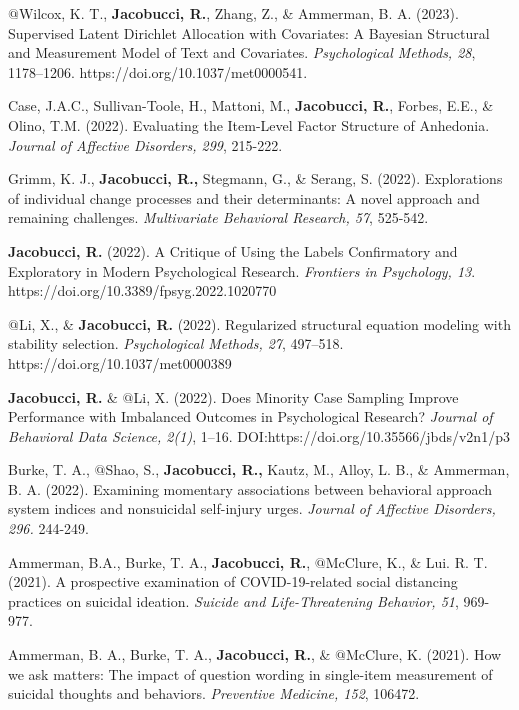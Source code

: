 \documentclass[letterpaper,10pt]{article}
\begin{document}
\begin{etaremune}
\item $@$Wilcox, K. T., \textbf{Jacobucci, R.}, Zhang, Z., \& Ammerman, B. A. (2023). Supervised Latent Dirichlet Allocation with Covariates: A Bayesian Structural and Measurement Model of Text and Covariates. \emph{Psychological Methods, 28}, 1178–1206. https://doi.org/10.1037/met0000541.
	
	
	\item Case, J.A.C., Sullivan-Toole, H., Mattoni, M., \textbf{Jacobucci, R.}, Forbes, E.E., \& Olino, T.M. (2022). Evaluating the Item-Level Factor Structure of Anhedonia. \emph{Journal of Affective Disorders, 299}, 215-222.
	
	\item Grimm, K. J., \textbf{Jacobucci, R.,} Stegmann, G., \& Serang, S. (2022). Explorations of individual change processes and their determinants: A novel approach and remaining challenges. \emph{Multivariate Behavioral Research, 57}, 525-542.
		\item \textbf{Jacobucci, R.} (2022). A Critique of Using the Labels Confirmatory and Exploratory in Modern Psychological Research. \textit{Frontiers in Psychology, 13}. https://doi.org/10.3389/fpsyg.2022.1020770
	\item $@$Li, X., \& \textbf{Jacobucci, R.} (2022). Regularized structural equation modeling with stability selection. \emph{Psychological Methods, 27}, 497–518. https://doi.org/10.1037/met0000389
		\item \textbf{Jacobucci, R.} \& $@$Li, X. (2022). Does Minority Case Sampling Improve Performance with Imbalanced Outcomes in Psychological Research? \emph{Journal of Behavioral Data Science, 2(1)}, 1–16. DOI:https://doi.org/10.35566/jbds/v2n1/p3
	\item Burke, T. A., $@$Shao, S., \textbf{Jacobucci, R.,} Kautz, M., Alloy, L. B., \& Ammerman, B. A. (2022). Examining momentary associations between behavioral approach system indices and nonsuicidal self-injury urges. \emph{Journal of Affective Disorders, 296.} 244-249.
		\item Ammerman, B.A., Burke, T. A., \textbf{Jacobucci, R.}, $@$McClure, K., \& Lui. R. T. (2021). A prospective examination of COVID-19-related social distancing practices on suicidal ideation. \emph{Suicide and Life-Threatening Behavior, 51}, 969-977.
	\item Ammerman, B. A., Burke, T. A., \textbf{Jacobucci, R.}, \& $@$McClure, K. (2021). How we ask matters: The impact of question wording in single-item measurement of suicidal thoughts and behaviors. \emph{Preventive Medicine, 152}, 106472.

\end{etaremune}
\end{document}
